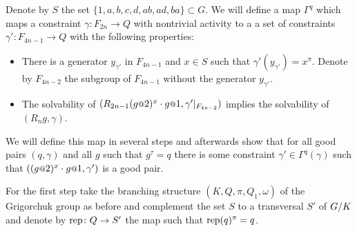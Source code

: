 \documentclass[a4paper,11pt]{amsart}
\begin{document}
Denote by $S$ the set $\{1,a,b,c,d,ab,ad,ba\}\subset G$.
We will define a map $\Gamma^q$ which maps a constraint $\gamma\colon F_{2n} \to Q$ with nontrivial activity to a a set of constraints $\gamma'\colon F_{4n-1}\to Q$ 
with the following properties:
\begin{itemize}
  \item There is a generator $y_{\gamma'}$ in $F_{4n-1}$ and $x\in S$ such that $\gamma'(y_{\gamma'})=x^\pi$. Denote by $F_{4n-2}$ the subgroup of $F_{4n-1}$ without the generator $y_{\gamma'}$.
  \item The solvability of $(R_{2n-1} (g\at{2})^x \cdot g\at{1},\gamma'|_{F_{4n-2}})$ implies
  the solvability of $(R_ng,\gamma)$.
 \end{itemize}

 We will define this map in several steps and afterwards show that for all good pairs $(q,\gamma)$ and all $g$ such that $g^\tau=q$ 
 there is some constraint $\gamma' \in \Gamma^q(\gamma)$ such that $((g\at{2})^x \cdot g\at{1},\gamma')$ is a good pair.
 
 For the first step take the branching structure $(K,Q,\pi,Q_1,\omega)$ of the Grigorchuk group as before and 
 complement the set $S$ to a transversal $S'$ of ${G/K}$ and denote by $\textup{rep}\colon Q\to S'$ 
 the map such that $\textup{rep}(q)^\pi = q$.
 
\end{document}
